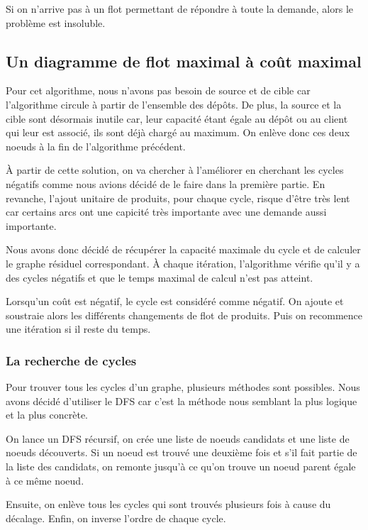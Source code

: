 \documentclass[a4paper,12pt]{article}
\begin{document}
Si on n'arrive pas à un flot permettant de répondre à toute la demande, alors le problème est insoluble.

\subsection{Un diagramme de flot maximal \`a co\^ut maximal}

Pour cet algorithme, nous n'avons pas besoin de source et de cible car l'algorithme circule \`a partir de l'ensemble des d\'ep\^ots. De plus, la source et la cible sont d\'esormais inutile car, leur capacit\'e \'etant \'egale au d\'ep\^ot ou au client qui leur est associ\'e, ils sont d\'ej\`a charg\'e au maximum. On enl\`eve donc ces deux noeuds \`a la fin de l'algorithme pr\'ec\'edent.

\`A partir de cette solution, on va chercher \`a l'am\'eliorer en cherchant les cycles n\'egatifs comme nous avions d\'ecid\'e de le faire dans la premi\`ere partie. En revanche, l'ajout unitaire de produits, pour chaque cycle, risque d'\^etre tr\`es lent car certains arcs ont une capicit\'e tr\`es importante avec une demande aussi importante.

Nous avons donc d\'ecid\'e de r\'ecup\'erer la capacit\'e maximale du cycle et de calculer le graphe r\'esiduel correspondant. \`A chaque it\'eration, l'algorithme v\'erifie qu'il y a des cycles n\'egatifs et que le temps maximal de calcul n'est pas atteint.

Lorsqu'un co\^ut est n\'egatif, le cycle est consid\'er\'e comme n\'egatif. On ajoute et soustraie alors les diff\'erents changements de flot de produits. Puis on recommence une it\'eration si il reste du temps.

\subsubsection{La recherche de cycles}

Pour trouver tous les cycles d'un graphe, plusieurs m\'ethodes sont possibles. Nous avons d\'ecid\'e d'utiliser le DFS car c'est la m\'ethode nous semblant la plus logique et la plus concr\`ete.

On lance un DFS r\'ecursif, on cr\'ee une liste de noeuds candidats et une liste de noeuds d\'ecouverts. Si un noeud est trouv\'e une deuxi\`eme fois et s'il fait partie de la liste des candidats, on remonte jusqu'\`a ce qu'on trouve un noeud parent \'egale \`a ce m\^eme noeud.

Ensuite, on enl\`eve tous les cycles qui sont trouv\'es plusieurs fois \`a cause du d\'ecalage. Enfin, on inverse l'ordre de chaque cycle.
\end{document}

